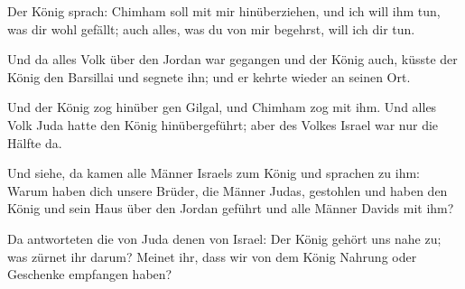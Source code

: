  Der König sprach: Chimham soll mit mir hinüberziehen,
und ich will ihm tun, was dir wohl gefällt; auch alles, was du von mir
begehrst, will ich dir tun.

 Und da alles Volk über den Jordan war gegangen und der
König auch, küsste der König den Barsillai und segnete ihn; und er
kehrte wieder an seinen Ort.

 Und der König zog hinüber gen Gilgal, und Chimham zog
mit ihm. Und alles Volk Juda hatte den König hinübergeführt; aber des
Volkes Israel war nur die Hälfte da.

 Und siehe, da kamen alle Männer Israels zum König und
sprachen zu ihm: Warum haben dich unsere Brüder, die Männer Judas,
gestohlen und haben den König und sein Haus über den Jordan geführt und
alle Männer Davids mit ihm?

 Da antworteten die von Juda denen von Israel: Der König
gehört uns nahe zu; was zürnet ihr darum? Meinet ihr, dass wir von dem
König Nahrung oder Geschenke empfangen haben?

